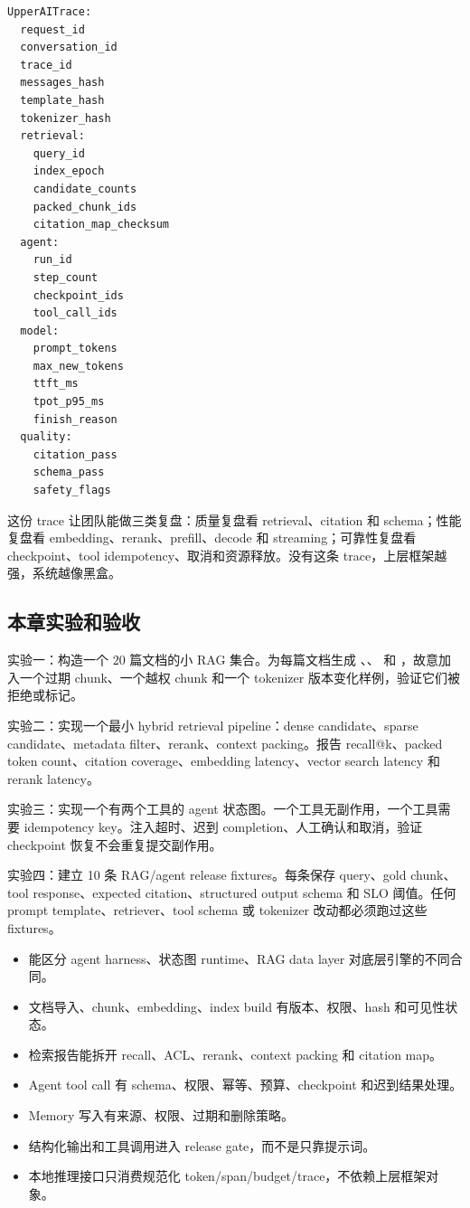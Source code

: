 \begin{lstlisting}[numbers=none,caption={UpperAITrace 最小结构}]
UpperAITrace:
  request_id
  conversation_id
  trace_id
  messages_hash
  template_hash
  tokenizer_hash
  retrieval:
    query_id
    index_epoch
    candidate_counts
    packed_chunk_ids
    citation_map_checksum
  agent:
    run_id
    step_count
    checkpoint_ids
    tool_call_ids
  model:
    prompt_tokens
    max_new_tokens
    ttft_ms
    tpot_p95_ms
    finish_reason
  quality:
    citation_pass
    schema_pass
    safety_flags
\end{lstlisting}

这份 trace 让团队能做三类复盘：质量复盘看 retrieval、citation 和 schema；性能复盘看 embedding、rerank、prefill、decode 和 streaming；可靠性复盘看 checkpoint、tool idempotency、取消和资源释放。没有这条 trace，上层框架越强，系统越像黑盒。

\subsection{本章实验和验收}

\begin{exercisebox}
实验一：构造一个 20 篇文档的小 RAG 集合。为每篇文档生成 、、 和 ，故意加入一个过期 chunk、一个越权 chunk 和一个 tokenizer 版本变化样例，验证它们被拒绝或标记。

实验二：实现一个最小 hybrid retrieval pipeline：dense candidate、sparse candidate、metadata filter、rerank、context packing。报告 recall@k、packed token count、citation coverage、embedding latency、vector search latency 和 rerank latency。

实验三：实现一个有两个工具的 agent 状态图。一个工具无副作用，一个工具需要 idempotency key。注入超时、迟到 completion、人工确认和取消，验证 checkpoint 恢复不会重复提交副作用。

实验四：建立 10 条 RAG/agent release fixtures。每条保存 query、gold chunk、tool response、expected citation、structured output schema 和 SLO 阈值。任何 prompt template、retriever、tool schema 或 tokenizer 改动都必须跑过这些 fixtures。
\end{exercisebox}

\begin{rubricbox}
\begin{itemize}
  \item 能区分 agent harness、状态图 runtime、RAG data layer 对底层引擎的不同合同。
  \item 文档导入、chunk、embedding、index build 有版本、权限、hash 和可见性状态。
  \item 检索报告能拆开 recall、ACL、rerank、context packing 和 citation map。
  \item Agent tool call 有 schema、权限、幂等、预算、checkpoint 和迟到结果处理。
  \item Memory 写入有来源、权限、过期和删除策略。
  \item 结构化输出和工具调用进入 release gate，而不是只靠提示词。
  \item 本地推理接口只消费规范化 token/span/budget/trace，不依赖上层框架对象。
\end{itemize}
\end{rubricbox}
